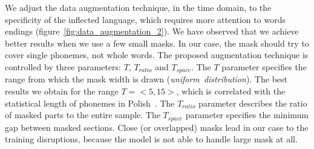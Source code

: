 We adjust the data augmentation technique, in the time domain, to the specificity of the inflected language,
which requires more attention to words endings (figure~\ref{fig:data_augmentation_2}).
We have observed that we achieve better results when we use a few small masks.
In our case, the mask should try to cover single phonemes, not whole words.
The proposed augmentation technique is controlled by three parameters: $T$, $T_{ratio}$ and $T_{space}$.
The $T$ parameter specifies the range from which the mask width is drawn (\textit{uniform~distribution}).
The best results we obtain for the range $T=<5,15>$, which is correlated with the statistical length
of phonemes in Polish~\cite{igras2013}.
The $T_{ratio}$ parameter describes the ratio of masked parts to the entire sample.
The $T_{space}$ parameter specifies the minimum gap between masked sections.
Close (or overlapped) masks lead in our case to the training disruptions, because
the model is not able to handle large mask at all.
